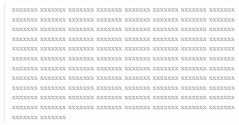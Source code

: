 \begin{abstract}
  xxxxxxx xxxxxxx xxxxxxx xxxxxxx xxxxxxx xxxxxxx xxxxxxx xxxxxxx xxxxxxx xxxxxxx xxxxxxx xxxxxxx xxxxxxx xxxxxxx xxxxxxx xxxxxxx xxxxxxx xxxxxxx xxxxxxx xxxxxxx xxxxxxx xxxxxxx xxxxxxx xxxxxxx xxxxxxx xxxxxxx xxxxxxx xxxxxxx xxxxxxx xxxxxxx xxxxxxx xxxxxxx xxxxxxx xxxxxxx xxxxxxx xxxxxxx xxxxxxx xxxxxxx xxxxxxx xxxxxxx xxxxxxx xxxxxxx xxxxxxx xxxxxxx xxxxxxx xxxxxxx xxxxxxx xxxxxxx xxxxxxx xxxxxxx xxxxxxx xxxxxxx xxxxxxx xxxxxxx xxxxxxx xxxxxxx xxxxxxx xxxxxxx xxxxxxx xxxxxxx 
  xxxxxxx xxxxxxx xxxxxxx xxxxxxx xxxxxxx xxxxxxx xxxxxxx xxxxxxx xxxxxxx xxxxxxx 
  xxxxxxx xxxxxxx xxxxxxx xxxxxxx xxxxxxx xxxxxxx xxxxxxx xxxxxxx xxxxxxx xxxxxxx 
  xxxxxxx xxxxxxx xxxxxxx xxxxxxx xxxxxxx xxxxxxx xxxxxxx xxxxxxx xxxxxxx xxxxxxx 
\end{abstract}

